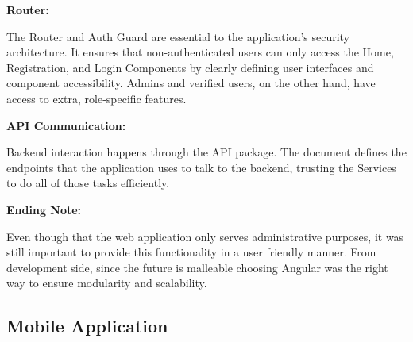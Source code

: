 \noindent\textbf{Router:} 

The Router and Auth Guard are essential to the application's security architecture. It ensures that non-authenticated users can only access the Home, Registration, and Login Components by clearly defining user interfaces and component accessibility. Admins and verified users, on the other hand, have access to extra, role-specific features.

\noindent\textbf{API Communication:}

Backend interaction happens through the API package. The document defines the endpoints that the application uses to talk to the backend, trusting the Services to do all of those tasks efficiently.

\noindent\textbf{Ending Note:}

Even though that the web application only serves administrative purposes, it was still important to provide this functionality in a user friendly manner. From development side, since the future is malleable choosing Angular was the right way to ensure modularity and scalability. 

\newpage

\subsection{Mobile Application}

